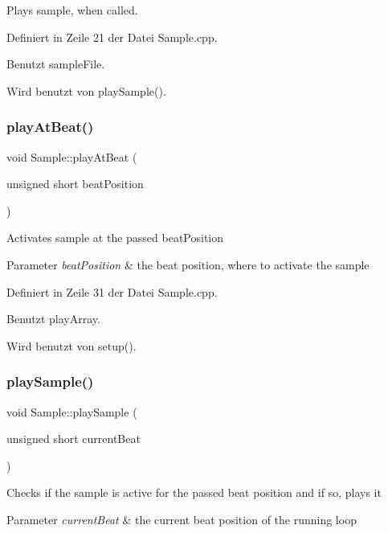 Plays sample, when called. 



Definiert in Zeile 21 der Datei Sample.\+cpp.



Benutzt sample\+File.



Wird benutzt von play\+Sample().

\mbox{\label{class_sample_a26322924f7a05091e13380c6494896da}} 
\subsubsection{\texorpdfstring{play\+At\+Beat()}{playAtBeat()}}
{\footnotesize\ttfamily void Sample\+::play\+At\+Beat (\begin{DoxyParamCaption}\item[{unsigned short}]{beat\+Position }\end{DoxyParamCaption})}

Activates sample at the passed beat\+Position 
\begin{DoxyParams}{Parameter}
{\em beat\+Position} & the beat position, where to activate the sample \\
\hline
\end{DoxyParams}


Definiert in Zeile 31 der Datei Sample.\+cpp.



Benutzt play\+Array.



Wird benutzt von setup().

\mbox{\label{class_sample_a720e0e4edc0eacfb6170951177eabc31}} 
\subsubsection{\texorpdfstring{play\+Sample()}{playSample()}}
{\footnotesize\ttfamily void Sample\+::play\+Sample (\begin{DoxyParamCaption}\item[{unsigned short}]{current\+Beat }\end{DoxyParamCaption})}

Checks if the sample is active for the passed beat position and if so, plays it 
\begin{DoxyParams}{Parameter}
{\em current\+Beat} & the current beat position of the running loop \\
\hline
\end{DoxyParams}



